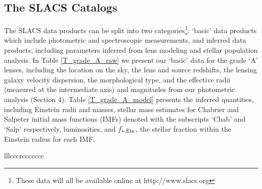 \documentclass[iop]{emulateapj}
\begin{document}
\subsection{The SLACS Catalogs}
The SLACS data products can be split into two categories\footnote{These data will all be available online at http://www.slacs.org}: `basic' data products which include photometric and spectroscopic measurements, and inferred data products, including parameters inferred from lens modeling and stellar population analysis. In Table \ref{T_grade_A_raw} we present our `basic' data for the grade `A' lenses, including the location on the sky, the lens and source redshifts, the lensing galaxy velocity dispersion, the morphological type, and the effective radii (measured at the intermediate axis) and magnitudes from our photometric analysis (Section 4). Table \ref{T_grade_A_model} presents the inferred quantities, including Einstein radii and masses, stellar mass estimates for Chabrier and Salpeter initial mass functions (IMFs) denoted with the subscripts `Chab' and `Salp' respectively, luminosities, and $f_{\rm *,Ein}$, the stellar fraction within the Einstein radius for each IMF.

\LongTables
\begin{deluxetable*}{lllcccrccccccc}
\tabletypesize{\scriptsize}
 \tablewidth{0pc}
\startdata

\enddata
\label{T_grade_A_raw}
\end{deluxetable*}
\end{document}
